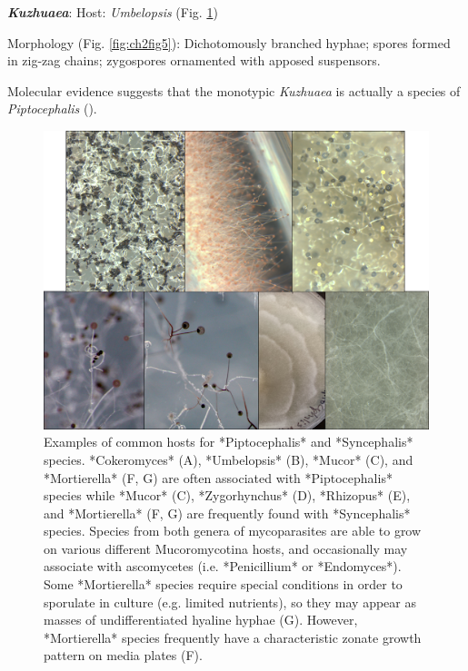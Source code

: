 \documentclass[]{book}
\begin{document}
\textbf{\emph{Kuzhuaea}}: Host: \emph{Umbelopsis} (Fig.
\ref{fig:ch2fig4})

Morphology (Fig. \ref{fig:ch2fig5}): Dichotomously branched hyphae;
spores formed in zig-zag chains; zygospores ornamented with apposed
suspensors.

Molecular evidence suggests that the monotypic \emph{Kuzhuaea} is
actually a species of \emph{Piptocephalis} (\citet{White_2006}).

\begin{figure}

{\centering \includegraphics[width=6.83in]{img/Fig4_Ch2} 

}

\caption{Examples of common hosts for *Piptocephalis* and *Syncephalis* species.  *Cokeromyces* (A), *Umbelopsis* (B), *Mucor* (C), and *Mortierella* (F, G) are often associated with *Piptocephalis* species while *Mucor* (C), *Zygorhynchus* (D), *Rhizopus* (E), and *Mortierella* (F, G) are frequently found with *Syncephalis* species.  Species from both genera of mycoparasites are able to grow on various different Mucoromycotina hosts, and occasionally may associate with ascomycetes (i.e. *Penicillium* or *Endomyces*).  Some *Mortierella* species require special conditions in order to sporulate in culture (e.g. limited nutrients), so they may appear as masses of undifferentiated hyaline hyphae (G).  However, *Mortierella* species frequently have a characteristic zonate growth pattern on media plates (F).}\label{fig:ch2fig4}
\end{figure}
\end{document}
